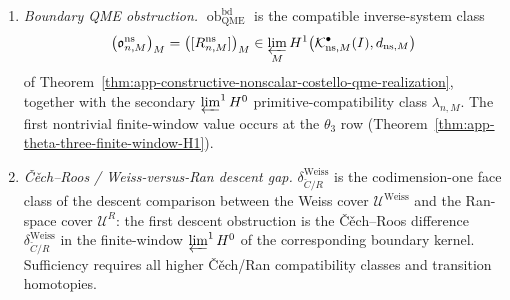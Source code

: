\begin{thm}
\begin{enumerate}[label=(\roman*)]
\[          -\sum_{\Gamma\in\mathsf A_{x,y,M}^{\mathrm{CE}}}
          \varepsilon^{\mathrm{CE}}_\Gamma
          K^M_\Gamma(\zeta_{\Gamma,x,y})
          + \tfrac12\sum_{(\Gamma_1,\Gamma_2)}
          \varepsilon_{\Gamma_1,\Gamma_2}
          \{K^M_{\Gamma_1},K^M_{\Gamma_2}\}_{\hbar,M}
          + R^{\mathrm{ct}}_{x,y,M}
      \]
      of the row machinery
      (Proposition~\ref{prop:app-marked-row-centrality-homotopy-test}).
      A centrality homotopy \(H^M_{x,y}\) with
      \(R^{\mathrm{cent}}_{x,y,M}+d_M H^M_{x,y}=0\) is the
      construction-level witness; the obstruction is the cohomology
      class of the row before such a witness exists.
    \item \emph{Boundary QME obstruction.}
      \(\operatorname{ob}^{\mathrm{bd}}_{\mathrm{QME}}\) is the
      compatible inverse-system class
      \[
        \bigl(\mathfrak o^{\mathrm{ns}}_{n,M}\bigr)_M
          =
        \bigl([R^{\mathrm{ns}}_{n,M}]\bigr)_M
        \in
        \varprojlim_M
        H^1\bigl(\mathcal K^\bullet_{\mathrm{ns},M}(I),
                  d_{\mathrm{ns},M}\bigr)
      \]
      of Theorem~\ref{thm:app-constructive-nonscalar-costello-qme-realization},
      together with the secondary
      \(\varprojlim^1H^0\) primitive-compatibility class
      \(\lambda_{n,M}\).  The first nontrivial finite-window value
      occurs at the \(\theta_3\) row
      (Theorem~\ref{thm:app-theta-three-finite-window-H1}).
    \item \emph{Č\v{e}ch--Roos / Weiss-versus-Ran descent gap.}
      \(\delta^{\mathrm{Weiss}}_{\check C/R}\) is the codimension-one
      face class of the descent comparison between the Weiss cover
      \(\mathcal U^{\mathrm{Weiss}}\) and the Ran-space cover
	      \(\mathcal U^R\): the first descent obstruction is the
	      Č\v{e}ch--Roos difference
	      \(\delta^{\mathrm{Weiss}}_{\check C/R}\) in the finite-window
	      \(\varprojlim^1 H^0\) of the corresponding boundary kernel.
	      Sufficiency requires all higher Č\v{e}ch/Ran compatibility
	      classes and transition homotopies.
  \end{enumerate}


\end{thm}
